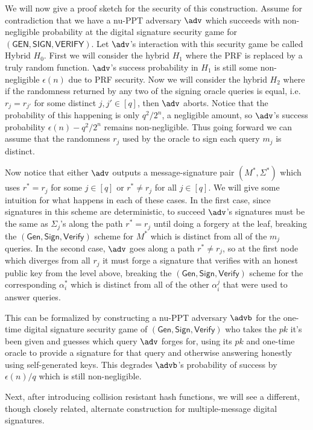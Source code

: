 \documentclass[12pt]{tufte-book}
\newcommand{\Gen}{\mathsf{Gen}}
\newcommand{\Sign}{\mathsf{Sign}}
\newcommand{\Verify}{\mathsf{Verify}}
\begin{document}
We will now give a proof sketch for the security of this construction. 
Assume for contradiction that we have a nu-PPT adversary $\adv$ which succeeds with non-negligible probability at the digital signature security game for $(\mathsf{GEN}, \mathsf{SIGN}, \mathsf{VERIFY})$. 
Let $\adv$'s interaction with this security game be called Hybrid $H_0$. 
First we will consider the hybrid $H_1$ where the PRF is replaced by a truly random function. 
$\adv$'s success probability in $H_1$ is still some non-negligible $\epsilon(n)$ due to PRF security. 
Now we will consider the hybrid $H_2$ where if the randomness returned by any two of the signing oracle queries is equal, i.e. $r_j = r_{j'}$ for some distinct $j, j' \in [q]$, then $\adv$ aborts. 
Notice that the probability of this happening is only $q^2/2^n$, a negligible amount, so $\adv$'s success probability $\epsilon(n) - q^2/2^n$ remains non-negligible. 
Thus going forward we can assume that the randomness $r_j$ used by the oracle to sign each query $m_j$ is distinct. 

Now notice that either $\adv$ outputs a message-signature pair $(M^*, \Sigma^*)$ which uses $r^* = r_j$ for some $j \in [q]$ or $r^* \not = r_j$ for all $j \in [q]$. 
We will give some intuition for what happens in each of these cases. 
In the first case, since signatures in this scheme are deterministic, to succeed $\adv$'s signatures must be the same as $\Sigma_j$'s along the path $r^* = r_j$ until doing a forgery at the leaf, breaking the $(\Gen, \Sign, \Verify)$ scheme for $M^*$ which is distinct from all of the $m_j$ queries. 
In the second case, $\adv$ goes along a path $r^* \not = r_j$, so at the first node which diverges from all $r_j$ it must forge a signature that verifies with an honest public key from the level above, breaking the $(\Gen, \Sign, \Verify)$ scheme for the corresponding $\alpha_i^*$ which is distinct from all of the other $\alpha_i^j$ that were used to answer queries. 

This can be formalized by constructing a nu-PPT adversary $\advb$ for the one-time digital signature security game of $(\Gen, \Sign, \Verify)$ who takes the $pk$ it's been given and guesses which query $\adv$ forges for, using its $pk$ and one-time oracle to provide a signature for that query and otherwise answering honestly using self-generated keys. 
This degrades $\advb$'s probability of success by $\epsilon(n)/q$ which is still non-negligible. 

Next, after introducing collision resistant hash functions, we will see a different, though closely related, alternate construction for multiple-message digital signatures. 
\end{document}
